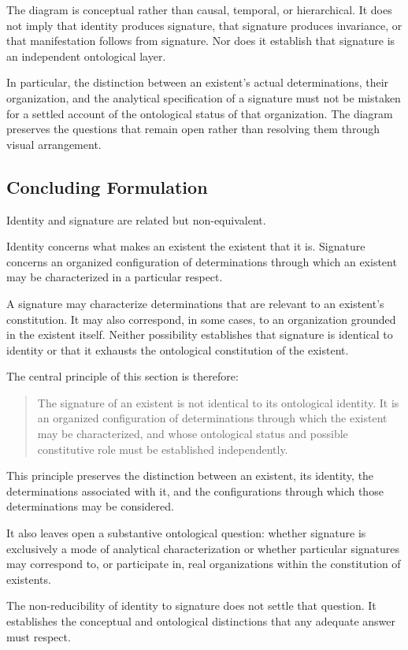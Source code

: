 

The diagram is conceptual rather than causal,
temporal, or hierarchical. It does not imply
that identity produces signature, that signature
produces invariance, or that manifestation
follows from signature. Nor does it establish
that signature is an independent ontological
layer.

In particular, the distinction between an
existent's actual determinations, their
organization, and the analytical specification
of a signature must not be mistaken for a
settled account of the ontological status of
that organization. The diagram preserves
the questions that remain open rather than
resolving them through visual arrangement.

\subsection{Concluding Formulation}

Identity and signature are related but
non-equivalent.

Identity concerns what makes an existent
the existent that it is. Signature concerns
an organized configuration of determinations
through which an existent may be characterized
in a particular respect.

A signature may characterize determinations
that are relevant to an existent's constitution.
It may also correspond, in some cases, to an
organization grounded in the existent itself.
Neither possibility establishes that signature
is identical to identity or that it exhausts
the ontological constitution of the existent.

The central principle of this section is
therefore:

\begin{quote}
The signature of an existent is not identical
to its ontological identity. It is an organized
configuration of determinations through which
the existent may be characterized, and whose
ontological status and possible constitutive
role must be established independently.
\end{quote}

This principle preserves the distinction
between an existent, its identity, the
determinations associated with it, and the
configurations through which those
determinations may be considered.

It also leaves open a substantive ontological
question: whether signature is exclusively
a mode of analytical characterization or
whether particular signatures may correspond
to, or participate in, real organizations
within the constitution of existents.

The non-reducibility of identity to signature
does not settle that question. It establishes
the conceptual and ontological distinctions
that any adequate answer must respect.

